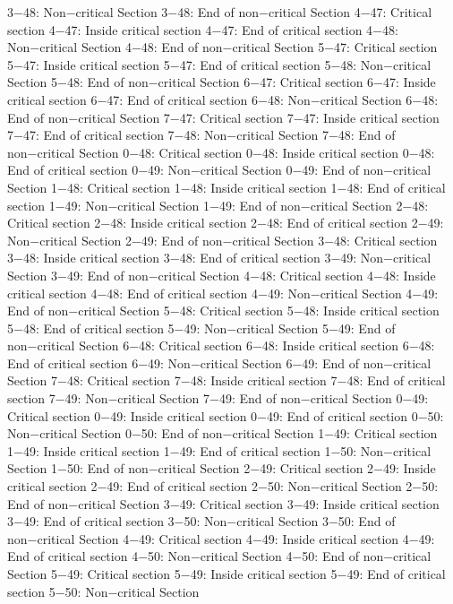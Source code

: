 3−48: Non−critical Section
3−48: End of non−critical Section
4−47: Critical section
4−47: Inside critical section
4−47: End of critical section
4−48: Non−critical Section
4−48: End of non−critical Section
5−47: Critical section
5−47: Inside critical section
5−47: End of critical section
5−48: Non−critical Section
5−48: End of non−critical Section
6−47: Critical section
6−47: Inside critical section
6−47: End of critical section
6−48: Non−critical Section
6−48: End of non−critical Section
7−47: Critical section
7−47: Inside critical section
7−47: End of critical section
7−48: Non−critical Section
7−48: End of non−critical Section
0−48: Critical section
0−48: Inside critical section
0−48: End of critical section
0−49: Non−critical Section
0−49: End of non−critical Section
1−48: Critical section
1−48: Inside critical section
1−48: End of critical section
1−49: Non−critical Section
1−49: End of non−critical Section
2−48: Critical section
2−48: Inside critical section
2−48: End of critical section
2−49: Non−critical Section
2−49: End of non−critical Section
3−48: Critical section
3−48: Inside critical section
3−48: End of critical section
3−49: Non−critical Section
3−49: End of non−critical Section
4−48: Critical section
4−48: Inside critical section
4−48: End of critical section
4−49: Non−critical Section
4−49: End of non−critical Section
5−48: Critical section
5−48: Inside critical section
5−48: End of critical section
5−49: Non−critical Section
5−49: End of non−critical Section
6−48: Critical section
6−48: Inside critical section
6−48: End of critical section
6−49: Non−critical Section
6−49: End of non−critical Section
7−48: Critical section
7−48: Inside critical section
7−48: End of critical section
7−49: Non−critical Section
7−49: End of non−critical Section
0−49: Critical section
0−49: Inside critical section
0−49: End of critical section
0−50: Non−critical Section
0−50: End of non−critical Section
1−49: Critical section
1−49: Inside critical section
1−49: End of critical section
1−50: Non−critical Section
1−50: End of non−critical Section
2−49: Critical section
2−49: Inside critical section
2−49: End of critical section
2−50: Non−critical Section
2−50: End of non−critical Section
3−49: Critical section
3−49: Inside critical section
3−49: End of critical section
3−50: Non−critical Section
3−50: End of non−critical Section
4−49: Critical section
4−49: Inside critical section
4−49: End of critical section
4−50: Non−critical Section
4−50: End of non−critical Section
5−49: Critical section
5−49: Inside critical section
5−49: End of critical section
5−50: Non−critical Section
